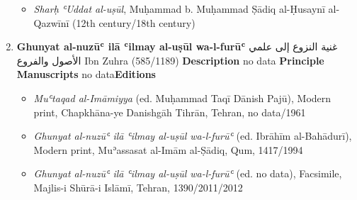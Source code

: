 \documentclass{article}
\begin{document}
\begin{enumerate}
\begin{itemize}
              \item \emph{Sharḥ ʿUddat al-uṣūl}, Muḥammad b. Muḥammad Ṣādiq al-Ḥusaynī al-Qazwīnī (12th century/18th century)
            \end{itemize}

      \item \textbf{Ghunyat al-nuzūʿ ilā ʿilmay al-uṣūl wa-l-furūʿ}
        \newline
        \textarabic{غنية النزوع إلى علمي الأصول والفروع}
        \newline
        Ibn Zuhra
        \newline
        (585/1189)
        \newline
        \newline
        \textbf{Description}
        \newline	
        no data
        \newline
        \newline
    \textbf{Principle Manuscripts}
\newline
no data\newline\textbf{Editions}
\begin{itemize}
        \item \emph{Muʿtaqad al-Imāmiyya} (ed. Muḥammad Taqī Dānish Pajū), Modern print, Chapkhāna-ye Danishgāh Tihrān, Tehran, no data/1961
        
        \item \emph{Ghunyat al-nuzūʿ ilā ʿilmay al-uṣūl wa-l-furūʿ} (ed. Ibrāhīm al-Bahādurī), Modern print, Muʾassasat al-Imām al-Ṣādiq, Qum, 1417/1994
        
        \item \emph{Ghunyat al-nuzūʿ ilā ʿilmay al-uṣūl wa-l-furūʿ} (ed. no data), Facsimile, Majlis-i Shūrā-i Islāmī, Tehran, 1390/2011/2012
        \end{itemize}


\end{enumerate}
\end{document}
